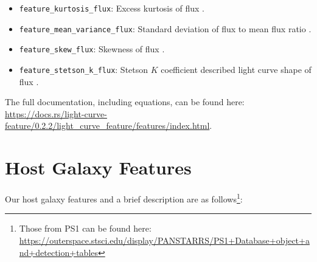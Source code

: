 \documentclass[twocolumn]{aastex63}
\begin{document}
\begin{itemize}
    \item \texttt{feature\_kurtosis\_flux}: Excess kurtosis of flux \citep{Malanchev2021}.
    \item \texttt{feature\_mean\_variance\_flux}: Standard deviation of flux to mean flux ratio \citep{Malanchev2021}.
    \item \texttt{feature\_skew\_flux}: Skewness of flux \citep{Malanchev2021}.
    \item \texttt{feature\_stetson\_k\_flux}: Stetson $K$ coefficient described light curve shape of flux \citep{Stetson1996}.
\end{itemize}


The full documentation, including equations, can be found here: \url{https://docs.rs/light-curve-feature/0.2.2/light_curve_feature/features/index.html}.


\section{Host Galaxy Features}
\label{appx:host_gal_features}


\renewcommand{\thefigure}{B.\arabic{figure}}
\setcounter{figure}{0}
\renewcommand{\thetable}{B.\arabic{table}} \setcounter{table}{0}

Our host galaxy features and a brief description are as follows\footnote{Those from PS1 can be found here: \url{https://outerspace.stsci.edu/display/PANSTARRS/PS1+Database+object+and+detection+tables}}:
\end{document}
